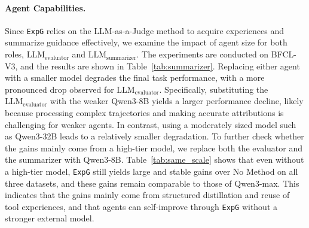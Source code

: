 \documentclass[11pt]{article}
\newcommand{\ours}{\texttt{ExpG}}
\begin{document}
\paragraph{Agent Capabilities.} Since {\ours} relies on the LLM-as-a-Judge method to acquire experiences and summarize guidance effectively, we examine the impact of agent size for both roles, ${\text{LLM}}_{\text{evaluator}}$ and ${\text{LLM}}_{\text{summarizer}}$. The experiments are conducted on BFCL-V3, and the results are shown in Table~\ref{tab:summarizer}. Replacing either agent with a smaller model degrades the final task performance, with a more pronounced drop observed for ${\text{LLM}}_{\text{evaluator}}$. Specifically, substituting the ${\text{LLM}}_{\text{evaluator}}$ with the weaker Qwen3-8B yields a larger performance decline, likely because processing complex trajectories and making accurate attributions is challenging for weaker agents. In contrast, using a moderately sized model such as Qwen3-32B leads to a relatively smaller degradation. 
To further check whether the gains mainly come from a high-tier model, we replace both the evaluator and the summarizer with Qwen3-8B. Table~\ref{tab:same_scale} shows that even without a high-tier model, {\ours} still yields large and stable gains over No Method on all three datasets, and these gains remain comparable to those of Qwen3-max. This indicates that the gains mainly come from structured distillation and reuse of tool experiences, and that agents can self-improve through {\ours} without a stronger external model.
\end{document}
